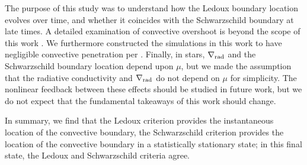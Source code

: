 The purpose of this study was to understand how the Ledoux boundary location evolves over time, and whether it coincides with the Schwarzschild boundary at late times.
A detailed examination of convective overshoot is beyond the scope of this work \citep[but see e.g.,][]{korre_etal_2019}.
We furthermore constructed the simulations in this work to have negligible convective penetration per \citet{anders_etal_2022}.
Finally, in stars, $\nabla_{\rm{rad}}$ and the Schwarzschild boundary location depend upon $\mu$, but we made the assumption that the radiative conductivity and $\nabla_{\rm{rad}}$ do not depend on $\mu$ for simplicity.
The nonlinear feedback between these effects should be studied in future work, but we do not expect that the fundamental takeaways of this work should change.

In summary, we find that the Ledoux criterion provides the instantaneous location of the convective boundary, the Schwarzschild criterion provides the location of the convective boundary in a statistically stationary state; in this final state, the Ledoux and Schwarzschild criteria agree.
